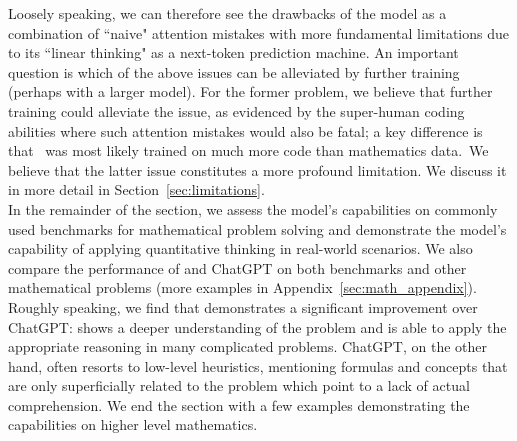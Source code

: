 Loosely speaking, we can therefore see the drawbacks of the model as a combination of ``naive" attention mistakes with more fundamental limitations due to its ``linear thinking" as a next-token prediction machine. An important question is which of the above issues can be alleviated by further training (perhaps with a larger model). For the former problem, we believe that further training could alleviate the issue, as evidenced by the super-human coding abilities where such attention mistakes would also be fatal; a key difference is that \DV\ was most likely trained on much more code than mathematics data. We believe that the latter issue constitutes a more profound limitation. We discuss it in more detail in Section~\ref{sec:limitations}. \\

In the remainder of the section, we assess the model's capabilities on commonly used benchmarks for mathematical problem solving and demonstrate the model's capability of applying quantitative thinking in real-world scenarios. We also compare the performance of {\DV} and ChatGPT on both benchmarks and other mathematical problems (more examples in Appendix~\ref{sec:math_appendix}). Roughly speaking, we find that {\DV} demonstrates a significant improvement over ChatGPT: {\DV} shows a deeper understanding of the problem and is able to apply the appropriate reasoning in many complicated problems. ChatGPT, on the other hand, often resorts to low-level heuristics, mentioning formulas and concepts that are only superficially related to the problem which point to a lack of actual comprehension. We end the section with a few examples demonstrating the capabilities on higher level mathematics.






